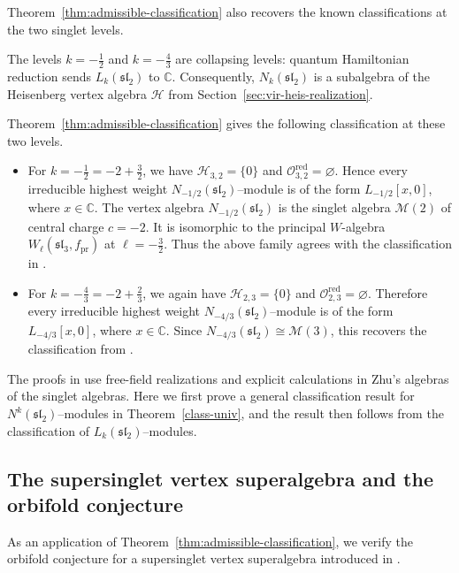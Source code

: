 \documentclass[11 pt]{amsart}
\theoremstyle{definition}
\theoremstyle{plain}
\begin{document}
Theorem~\ref{thm:admissible-classification} also recovers the known
classifications at the two singlet levels.

The levels $k=-\frac{1}{2}$ and $k=-\frac{4}{3}$ are collapsing levels:
quantum Hamiltonian reduction sends $L_k(\mathfrak{sl}_2)$ to
$\mathbb C$. Consequently, $N_k(\mathfrak{sl}_2)$ is a subalgebra of
the Heisenberg vertex algebra $\mathcal H$ from
Section~\ref{sec:vir-heis-realization}.


Theorem~\ref{thm:admissible-classification} gives the following
classification at these two levels.
\begin{itemize}
\item For $k=-\frac12=-2+\frac32$, we have
$\mathcal H_{3,2}=\{0\}$ and
$\mathcal O^{\mathrm{red}}_{3,2}=\varnothing$.
Hence every irreducible highest weight
$N_{-1/2}(\mathfrak{sl}_2)$--module is of the form
$L_{-1/2}[x,0]$, where $x\in\mathbb C$.
The vertex algebra $N_{-1/2}(\mathfrak{sl}_2)$ is the singlet algebra
$\mathcal M(2)$ of central charge $c=-2$. It is isomorphic to the principal
$W$-algebra $W_{\ell}(\mathfrak{sl}_3,f_{\mathrm{pr}})$ at
$\ell=-\frac{3}{2}$. Thus the above family agrees with the classification
in
\cite{WangW3}.

\item For $k=-\frac43=-2+\frac23$, we again have
$\mathcal H_{2,3}=\{0\}$ and
$\mathcal O^{\mathrm{red}}_{2,3}=\varnothing$.
Therefore every irreducible highest weight
$N_{-4/3}(\mathfrak{sl}_2)$--module is of the form
$L_{-4/3}[x,0]$, where $x\in\mathbb C$.
Since $N_{-4/3}(\mathfrak{sl}_2)\cong\mathcal M(3)$, this recovers the
classification from \cite{A-2003}.
\end{itemize}
The proofs in \cite{A-2003,WangW3} use free-field realizations and
explicit calculations in Zhu's algebras of the singlet algebras. Here
we first prove a general classification result for
$N^k(\mathfrak{sl}_2)$--modules in Theorem~\ref{class-univ}, and the
result then follows from the classification of
$L_k(\mathfrak{sl}_2)$--modules.


\subsection{The supersinglet vertex superalgebra and the orbifold conjecture}

As an application of
Theorem~\ref{thm:admissible-classification},
we verify the orbifold conjecture for  a supersinglet vertex
superalgebra introduced in  \cite{AMSuperTriplet}.
\end{document}
